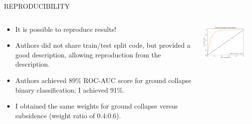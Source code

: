 \documentclass[11pt, aspectratio=169]{beamer}
\begin{document}
\begin{frame}{\MakeUppercase{Reproducibility}}

\begin{columns}[c]
    \begin{column}{.6\textwidth}
        \begin{itemize}
            \item It is possible to reproduce results!
            \item Authors did not share train/test split code, but provided a good description, allowing reproduction from the description.
            \item Authors achieved 89\% ROC-AUC score for ground collapse binary classification; I achieved 91\%.
            \item I obtained the same weights for ground collapse versus subsidence (weight ratio of 0.4:0.6).
        \end{itemize}
    \end{column}
    \begin{column}{.4\textwidth}
        \includegraphics[width=5cm]{output/original_roc_curve}
    \end{column}
\end{columns}

\end{frame}
\end{document}
